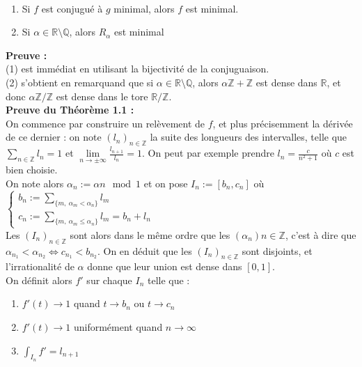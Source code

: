 \documentclass[11pt,a4paper]{article}
\begin{document}
\begin{proposition} ~ 
\begin{enumerate}
\item Si $f$ est conjugué à $g$ minimal, alors $f$ est minimal.
\item Si $\alpha \in \mathbb{R} \setminus \mathbb{Q}$, alors $R_\alpha$ est minimal
\end{enumerate}
\end{proposition}

\textbf{Preuve :} \\ 
(1) est immédiat en utilisant la bijectivité de la conjuguaison. \\
(2) s'obtient en remarquand que si $\alpha \in \mathbb{R} \setminus \mathbb{Q}$, alors $\alpha\mathbb{Z} + \mathbb{Z}$ est dense dans $\mathbb{R}$, et donc $\alpha\mathbb{Z}/\mathbb{Z}$ est dense dans le tore $\mathbb{R}/\mathbb{Z}$. \\

\textbf{Preuve du Théorème 1.1 :} \\

On commence par construire un relèvement de $f$, et plus précisemment la dérivée de ce dernier : on note $(l_n)_{n\in \mathbb{Z}}$ la suite des longueurs des intervalles, telle que $\displaystyle \sum_{n\in \mathbb{Z}} l_n = 1$ et $\displaystyle \lim\limits_{n \to \pm \infty } \frac{l_{n+1}}{l_n} = 1 $. On peut par exemple prendre $l_n = \displaystyle \frac{c}{n^2 + 1}$ où $c$ est bien choisie. \\
On note alors $ \alpha_n := \alpha n \mod 1$ et on pose $I_n := [b_n , c_n]$ où $\begin{cases} b_n := \displaystyle \sum_{\{m, \ \alpha_m < \alpha_n\}} l_m \\ c_n := \displaystyle \sum_{\{m, \ \alpha_m \leq \alpha_n\}} l_m  = b_n + l_n \end{cases}$ \\

Les $(I_n)_{n\in \mathbb{Z}}$ sont alors dans le même ordre que les $(\alpha_n){n\in \mathbb{Z}}$, c'est à dire que $\alpha_{n_1} < \alpha_{n_2} \Leftrightarrow c_{n_1} < b_{n_2}$. On en déduit que les $(I_n)_{n\in \mathbb{Z}}$ sont disjoints, et l'irrationalité de $\alpha$ donne que leur union est dense dans $[0, 1]$. \\

On définit alors $f'$ sur chaque $I_n$ telle que : 
\begin{enumerate}
\item $f'(t) \to 1$ quand $t\to b_n$ ou $t\to c_n$
\item $f'(t) \to 1$ uniformément quand $n\to \infty$
\item $\displaystyle \int_{I_n}f'=l_{n+1}$
\end{enumerate}
\end{document}
